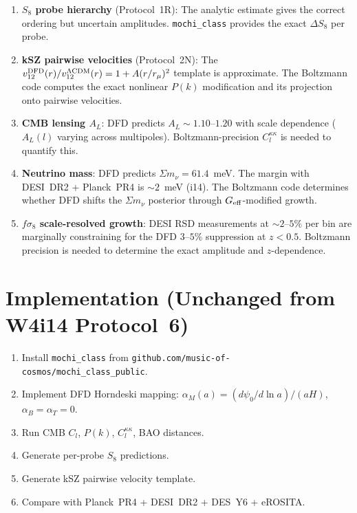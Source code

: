 \documentclass[11pt]{article}
\newcommand{\LCDM}{\Lambda\text{CDM}}
\newcommand{\Geff}{G_{\rm eff}}
\begin{document}
\begin{enumerate}[nosep]
\item \textbf{$S_8$ probe hierarchy} (Protocol~1R): The analytic estimate
  gives the correct ordering but uncertain amplitudes.
  \texttt{mochi\_class} provides the exact $\Delta S_8$ per probe.

\item \textbf{kSZ pairwise velocities} (Protocol~2N): The
  $v_{12}^{\rm DFD}(r)/v_{12}^{\LCDM}(r) = 1 + A(r/r_\mu)^2$ template
  is approximate. The Boltzmann code computes the exact nonlinear
  $P(k)$ modification and its projection onto pairwise velocities.

\item \textbf{CMB lensing $A_L$}: DFD predicts $A_L \sim 1.10$--$1.20$
  with scale dependence ($A_L(l)$ varying across multipoles).
  Boltzmann-precision $C_l^{\kappa\kappa}$ is needed to quantify this.

\item \textbf{Neutrino mass}: DFD predicts $\Sigma m_\nu = 61.4$~meV.
  The margin with DESI~DR2 + Planck~PR4 is $\sim 2$~meV (i14). The
  Boltzmann code determines whether DFD shifts the $\Sigma m_\nu$
  posterior through $\Geff$-modified growth.

\item \textbf{$f\sigma_8$ scale-resolved growth}: DESI RSD measurements
  at $\sim 2$--$5\%$ per bin are marginally constraining for the
  DFD $3$--$5\%$ suppression at $z < 0.5$. Boltzmann precision is
  needed to determine the exact amplitude and $z$-dependence.
\end{enumerate}

\section{Implementation (Unchanged from W4i14 Protocol~6)}

\begin{enumerate}[label=\textbf{B.\arabic*:}, nosep]
\item Install \texttt{mochi\_class} from
  \texttt{github.com/music-of-cosmos/mochi\_class\_public}.
\item Implement DFD Horndeski mapping: $\alpha_M(a) = (d\psi_0/d\ln a)/(aH)$,
  $\alpha_B = \alpha_T = 0$.
\item Run CMB $C_l$, $P(k)$, $C_l^{\kappa\kappa}$, BAO distances.
\item Generate per-probe $S_8$ predictions.
\item Generate kSZ pairwise velocity template.
\item Compare with Planck~PR4 + DESI~DR2 + DES~Y6 + eROSITA.
\end{enumerate}
\end{document}
